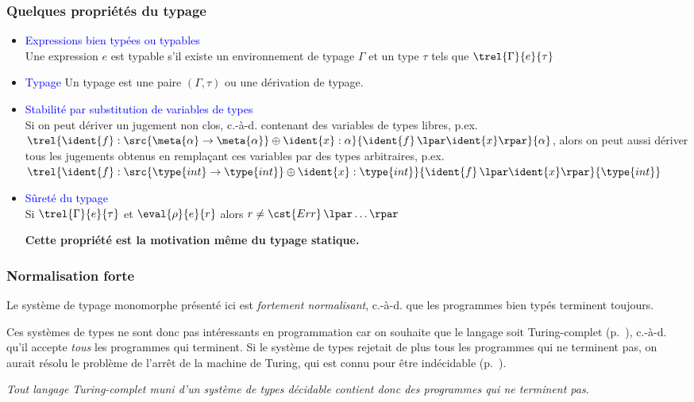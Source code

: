 %
\begin{frame}
\frametitle{Quelques propriétés du typage}

\begin{itemize}

  \item \textcolor{blue}{Expressions bien typées ou typables}\\ Une
    expression $e$ est typable s'il existe un environnement de typage
    $\Gamma$ et un type $\tau$ tels que $\trel{\Gamma}{e}{\tau}$

  \item \textcolor{blue}{Typage} \quad Un typage est une paire
  $(\Gamma,\tau)$ ou une dérivation de typage.

  \item \textcolor{blue}{Stabilité par substitution de variables de types}\\
  Si on peut dériver un jugement non clos, c.-à-d. contenant des
  variables de types libres, p.ex. $\trel{\ident{f}:\src{\meta{\alpha}
  \rightarrow \meta{\alpha}} \oplus \ident{x}:\alpha}{\ident{f} \,
  \lpar\ident{x}\rpar}{\alpha}$, alors on peut aussi dériver tous les
  jugements obtenus en remplaçant ces variables par des types
  arbitraires, p.ex. $\trel{\ident{f}:\src{\type{int} \rightarrow
  \type{int}} \oplus \ident{x}:\type{int}}{\ident{f} \,
  \lpar\ident{x}\rpar}{\type{int}}$

  \item \textcolor{blue}{Sûreté du typage}\\ Si $\trel{\Gamma}{e}{\tau}$ et
  $\eval{\rho}{e}{r}$ alors $r \neq \cst{Err} \, \lpar\ldots\rpar$

  \textbf{Cette propriété est la motivation même du typage statique.}

\end{itemize}

\end{frame}

%
\begin{frame}
\frametitle{Normalisation forte}

Le système de typage monomorphe présenté ici est \emph{fortement
normalisant}, c.-à-d. que les programmes bien typés terminent
toujours.

\bigskip

Ces systèmes de types ne sont donc pas intéressants en
programmation car on souhaite que le langage soit Turing-complet
(p.~\pageref{turing}), c.-à-d. qu'il accepte \emph{tous} les
programmes qui terminent. Si le système de types rejetait de plus tous
les programmes qui ne terminent pas, on aurait résolu le problème de
l'arrêt de la machine de Turing, qui est connu pour être indécidable
(p.~\pageref{indecidabilite}).

\bigskip

\emph{Tout langage Turing-complet muni d'un système de types décidable
  contient donc des programmes qui ne terminent pas.}

\end{frame}

